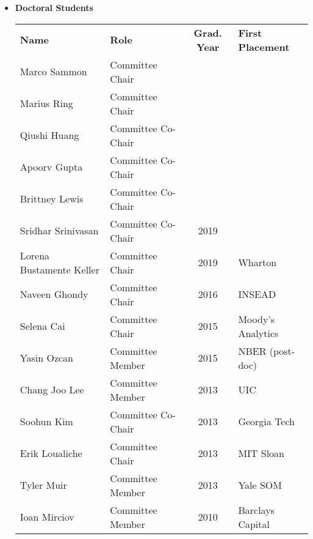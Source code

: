 \documentclass[11pt,letterpaper,serif,overlapped]{res}
\begin{document}
\begin{resume}
\begin{itemize}
\begin{longtable}{lp{11.5cm}}
 \end{longtable}

\vspace{0.5cm}

\item \textbf{Doctoral Students}\\
\begin{longtable}{llcl}
\textbf{Name} & \textbf{Role} & \textbf{Grad. Year }& \textbf{First Placement}\\
Marco Sammon  & Committee Chair\\
Marius Ring &   Committee Chair\\
Qiushi Huang & Committee Co-Chair\\
Apoorv Gupta  & Committee Co-Chair\\
Brittney Lewis  &Committee Co-Chair  \\
Sridhar  Srinivasan  &Committee Co-Chair  & 2019\\
Lorena Bustamente Keller & Committee Chair & 2019& Wharton \\
Naveen Ghondy  &  Committee Chair &2016 & INSEAD \\
Selena Cai  &  Committee Chair &2015 & Moody's Analytics\\
Yasin Ozcan  & Committee Member &2015 & NBER (post-doc)\\
Chang Joo Lee   &  Committee Member &2013 & UIC \\
Soohun Kim   &  Committee  Co-Chair  &2013 & Georgia Tech \\
Erik Loualiche & Committee  Chair&2013    & MIT Sloan \\
Tyler Muir&   Committee Member  &2013& Yale  SOM\\
Ioan Mirciov  & Committee Member&2010 & Barclays Capital\\


\end{longtable}



\end{itemize}





\end{resume}
\end{document}
